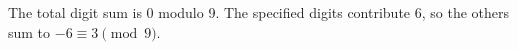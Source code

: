 The total digit sum is 0 modulo 9. The specified digits contribute 6, so the others sum to $-6\equiv\boxed3\pmod9$.
